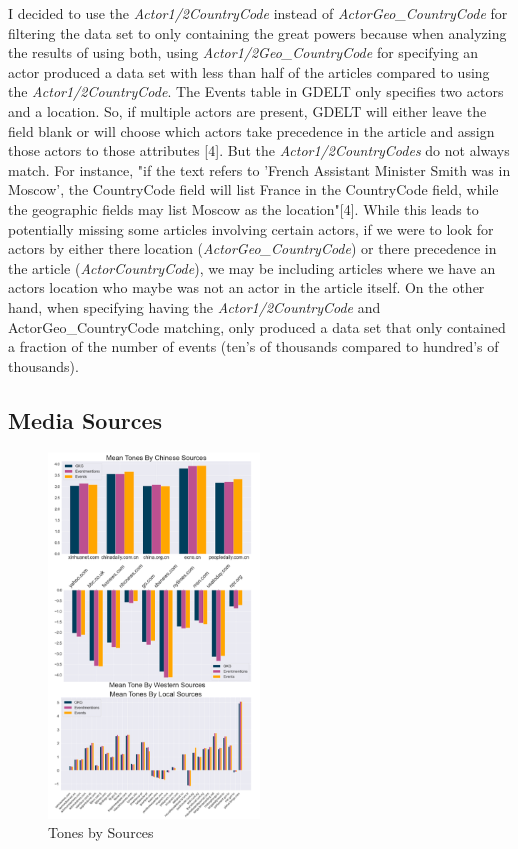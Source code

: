 \documentclass[12pt]{article}
\begin{document}
I decided to use the \textit{Actor1/2CountryCode} instead of \textit{ActorGeo\_CountryCode} for filtering the data set to only containing the great powers because when analyzing the results of using both, using \textit{Actor1/2Geo\_CountryCode} for specifying an actor produced a data set with less than half of the articles compared to using the \textit{Actor1/2CountryCode}. The Events table in GDELT only specifies two actors and a location. So, if multiple actors are present, GDELT will either leave the field blank or will choose which actors take precedence in the article and assign those actors to those attributes [4]. But the \textit{Actor1/2CountryCodes} do not always match. For instance, "if the text refers to 'French Assistant Minister Smith was in Moscow', the CountryCode field will list France in the CountryCode field, while the geographic fields may list Moscow as the location"[4]. While this leads to potentially missing some articles involving certain actors, if we were to look for actors by either there location (\textit{ActorGeo\_CountryCode}) or there precedence in the article (\textit{ActorCountryCode}), we may be including articles where we have an actors location who maybe was not an actor in the article itself. On the other hand, when specifying having the\textit{ Actor1/2CountryCode} and ActorGeo\_CountryCode matching, only produced a data set that only contained a fraction of the number of events (ten's of thousands compared to hundred's of thousands). 

\subsection*{Media Sources}

\begin{figure}
\vspace{-70pt}
  \begin{center}
    \includegraphics[width=0.5\textwidth]{3 Graphs.eps}
  \end{center}
  \vspace{-20pt}
  \caption{Tones by Sources}
  \vspace{-20pt}
  \label{fig:3Graphs}
\end{figure}
\end{document}
